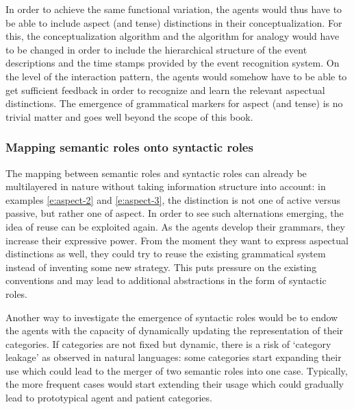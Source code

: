 In order to achieve the same functional variation, the agents would thus have to be able to include aspect (and tense) distinctions in their conceptualization. For this, the conceptualization algorithm and the algorithm for analogy would have to be changed in order to include the hierarchical structure of the event descriptions and the time stamps provided by the event recognition system. On the level of the interaction pattern, the agents would somehow have to be able to get sufficient feedback in order to recognize and learn the relevant aspectual distinctions. The emergence of grammatical markers for aspect (and tense) is no trivial matter and goes well beyond the scope of this book.


\subsubsection{Mapping semantic roles onto syntactic roles}
 The mapping between semantic roles and syntactic roles can already be multilayered in nature without taking information structure into account: in examples \ref{e:aspect-2} and \ref{e:aspect-3}, the distinction is not one of active versus passive, but rather one of aspect. In order to see such alternations emerging, the idea of reuse can be exploited again. As the agents develop their grammars, they increase their expressive power. From the moment they want to express aspectual distinctions as well, they could try to reuse the existing grammatical system instead of inventing some new strategy. This puts pressure on the existing conventions and may lead to additional abstractions in the form of syntactic roles.

Another way to investigate the emergence of syntactic roles would be to endow the agents with the capacity of dynamically updating the representation of their categories. If categories are not fixed but dynamic, there is a risk of `category leakage' as observed in natural languages: some categories start expanding their use which could lead to the merger of two semantic roles into one case. Typically, the more frequent cases would start extending their usage which could gradually lead to prototypical agent and patient categories.


